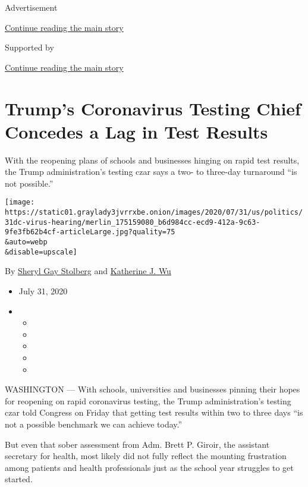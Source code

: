 Advertisement

\protect\hyperlink{after-top}{Continue reading the main story}

Supported by

\protect\hyperlink{after-sponsor}{Continue reading the main story}

\hypertarget{trumps-coronavirus-testing-chief-concedes-a-lag-in-test-results}{%
\section{Trump's Coronavirus Testing Chief Concedes a Lag in Test
Results}\label{trumps-coronavirus-testing-chief-concedes-a-lag-in-test-results}}

With the reopening plans of schools and businesses hinging on rapid test
results, the Trump administration's testing czar says a two- to
three-day turnaround ``is not possible.''

\texttt{[image: https://static01.graylady3jvrrxbe.onion/images/2020/07/31/us/politics/31dc-virus-hearing/merlin\_175159080\_b6d984cc-ecd9-412a-9c63-9fe3fb62b4cf-articleLarge.jpg?quality=75\\\&auto=webp\\\&disable=upscale]}

By
\href{https://www.nytimes3xbfgragh.onion/by/sheryl-gay-stolberg}{Sheryl
Gay Stolberg} and
\href{https://www.nytimes3xbfgragh.onion/by/katherine-j--wu}{Katherine
J. Wu}

\begin{itemize}
\item
  July 31, 2020
\item
  \begin{itemize}
  \item
  \item
  \item
  \item
  \item
  \end{itemize}
\end{itemize}

WASHINGTON --- With schools, universities and businesses pinning their
hopes for reopening on rapid coronavirus testing, the Trump
administration's testing czar told Congress on Friday that getting test
results within two to three days ``is not a possible benchmark we can
achieve today.''

But even that sober assessment from Adm. Brett P. Giroir, the assistant
secretary for health, most likely did not fully reflect the mounting
frustration among patients and health professionals just as the school
year struggles to get started.

